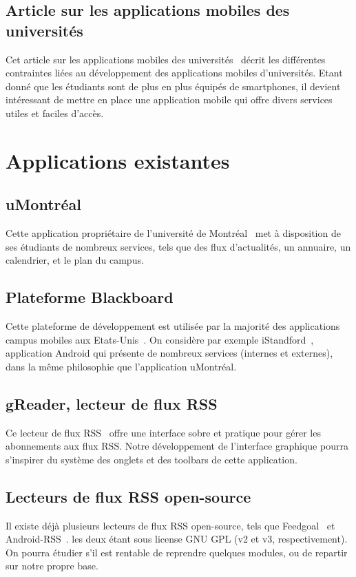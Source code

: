 \documentclass [pdftex,12pt] {report}
\begin{document}
\subsection{Article sur les applications mobiles des universités}
Cet article sur les applications mobiles des universités~\cite{Article} décrit les différentes contraintes liées au développement des applications mobiles d'universités. Etant donné que les étudiants sont de plus en plus équipés de smartphones, il devient intéressant de mettre en place une application mobile qui offre divers services utiles et faciles d'accès.


\section{Applications existantes}

\subsection{uMontréal}
Cette application propriétaire de l'université de Montréal~\cite{uMontreal} met à disposition de ses étudiants de nombreux services, tels que des flux d'actualités, un annuaire, un calendrier, et le plan du campus.

\subsection{Plateforme Blackboard}
Cette plateforme de développement est utilisée par la majorité des applications campus mobiles aux Etats-Unis~\cite{Blackboard}. On considère par exemple iStandford~\cite{iStanford}, application Android qui présente de nombreux services (internes et externes), dans la même philosophie que l'application uMontréal.

\subsection{gReader, lecteur de flux RSS}
Ce lecteur de flux RSS~\cite{gReader} offre une interface sobre et pratique pour gérer les abonnements aux flux RSS. Notre développement de l'interface graphique pourra s'inspirer du système des onglets et des toolbars de cette application.

\subsection{Lecteurs de flux RSS open-source}
Il existe déjà plusieurs lecteurs de flux RSS open-source, tels que Feedgoal~\cite{Feedgoal} et Android-RSS~\cite{Android-RSS}. les deux étant sous license GNU GPL (v2 et v3, respectivement). On pourra étudier s'il est rentable de reprendre quelques modules, ou de repartir sur notre propre base.
\end{document}
